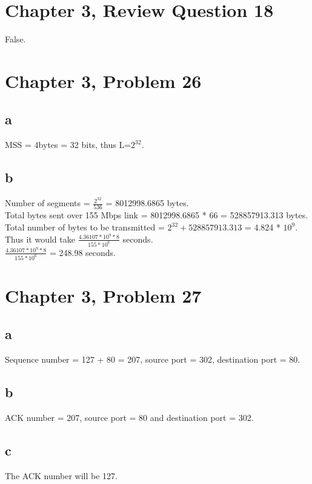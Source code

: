 \documentclass{article}
\begin{document}
\section*{Chapter 3, Review Question 18}
False.\\

\section*{Chapter 3, Problem 26}
\subsection*{a} MSS = 4bytes = 32 bits, thus L=$2^{32}$.\\
\subsection*{b} Number of segments = $\frac{2^{32}}{536}$ = 8012998.6865 bytes.\\
\newline Total bytes sent over 155 Mbps link = 8012998.6865 * 66 = 528857913.313 bytes.\\
\newline Total number of bytes to be transmitted = $2^{32} + 528857913.313$ = 4.824 * $10^9$.\\
\newline Thus it would take $\frac{4.36107 * 10 ^9 * 8}{155*10^6}$ seconds.\\
\newline $\frac{4.36107 * 10 ^9 * 8}{155*10^6}$ = 248.98 seconds.\\

\section*{Chapter 3, Problem 27}
\subsection*{a} Sequence number = 127 + 80 = 207, source port = 302, destination port = 80.\\
\subsection*{b} ACK number = 207, source port = 80 and destination port = 302.\\
\subsection*{c} The ACK number will be 127.\\
\end{document}
